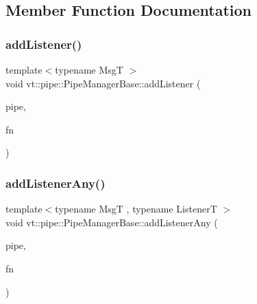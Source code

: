 \subsection{Member Function Documentation}
\mbox{\label{structvt_1_1pipe_1_1_pipe_manager_base_aa878aef84540ec6c2ca89096683d407e}} 
\subsubsection{\texorpdfstring{add\+Listener()}{addListener()}}
{\footnotesize\ttfamily template$<$typename MsgT $>$ \\
void vt\+::pipe\+::\+Pipe\+Manager\+Base\+::add\+Listener (\begin{DoxyParamCaption}\item[{\hyperlink{namespacevt_ac9852acda74d1896f48f406cd72c7bd3}{Pipe\+Type} const \&}]{pipe,  }\item[{\hyperlink{structvt_1_1pipe_1_1_pipe_manager_base_aa54eee64ab32a27777a672d49eb861f4}{Func\+Msg\+Type}$<$ MsgT $>$}]{fn }\end{DoxyParamCaption})}

\mbox{\label{structvt_1_1pipe_1_1_pipe_manager_base_aee28bc7a33e3a0b796aa8fcdd6f72bd9}} 
\subsubsection{\texorpdfstring{add\+Listener\+Any()}{addListenerAny()}}
{\footnotesize\ttfamily template$<$typename MsgT , typename ListenerT $>$ \\
void vt\+::pipe\+::\+Pipe\+Manager\+Base\+::add\+Listener\+Any (\begin{DoxyParamCaption}\item[{\hyperlink{namespacevt_ac9852acda74d1896f48f406cd72c7bd3}{Pipe\+Type} const \&}]{pipe,  }\item[{ListenerT \&\&}]{fn }\end{DoxyParamCaption})\hspace{0.3cm}{\ttfamily [protected]}}

